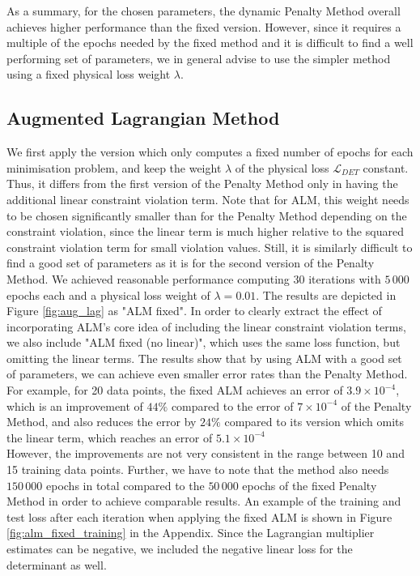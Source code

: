 As a summary, for the chosen parameters, the dynamic Penalty Method overall achieves higher performance than the fixed version. However, since it requires a multiple of the epochs needed by the fixed method and it is difficult to find a well performing set of parameters, we in general advise to use the simpler method using a fixed physical loss weight $\lambda$.

\subsection{Augmented Lagrangian Method}

We first apply the version which only computes a fixed number of epochs for each minimisation problem, and keep the weight $\lambda$ of the physical loss $\mathcal{L}_{DET}$ constant. Thus, it differs from the first version of the Penalty Method only in having the additional linear constraint violation term. Note that for ALM, this weight needs to be chosen significantly smaller than for the Penalty Method depending on the constraint violation, since the linear term is much higher relative to the squared constraint violation term for small violation values. Still, it is similarly difficult to find a good set of parameters as it is for the second version of the Penalty Method. We achieved reasonable performance computing 30 iterations with $5\,000$ epochs each and a physical loss weight of $\lambda = 0.01$. The results are depicted in Figure \ref{fig:aug_lag} as "ALM fixed". In order to clearly extract the effect of incorporating ALM's core idea of including the linear constraint violation terms, we also include "ALM fixed (no linear)", which uses the same loss function, but omitting the linear terms. The results show that by using ALM with a good set of parameters, we can achieve even smaller error rates than the Penalty Method. For example, for 20 data points, the fixed ALM achieves an error of $3.9 \times 10^{-4}$, which is an improvement of $44\%$ compared to the error of $7 \times 10^{-4}$ of the Penalty Method, and also reduces the error by $24\%$ compared to its version which omits the linear term, which reaches an error of $5.1 \times 10^{-4} $\\
\indent However, the improvements are not very consistent in the range between 10 and 15 training data points. Further, we have to note that the method also needs $150\,000$ epochs in total compared to the $50\,000$ epochs of the fixed Penalty Method in order to achieve comparable results. An example of the training and test loss after each iteration when applying the fixed ALM is shown in Figure \ref{fig:alm_fixed_training} in the Appendix. Since the Lagrangian multiplier estimates can be negative, we included the negative linear loss for the determinant as well.
